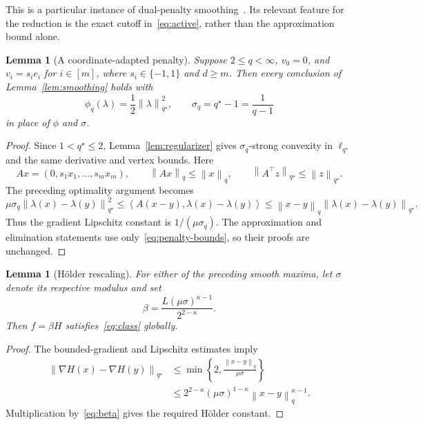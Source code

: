 \documentclass[11pt,a4paper]{article}
\newtheorem{lemma}[theorem]{Lemma}
\theoremstyle{definition}
\theoremstyle{remark}
\newcommand{\norm}[1]{\left\lVert #1\right\rVert}
\newcommand{\ip}[2]{\left\langle #1,#2\right\rangle}
\begin{document}
This is a particular instance of dual-penalty smoothing~\cite{Nes05}.
Its relevant feature for the reduction is the exact cutoff
in~\eqref{eq:active}, rather than the approximation bound alone.

\begin{lemma}[A coordinate-adapted penalty]\label{lem:coordinate-penalty}
Suppose $2\le q<\infty$, $v_0=0$, and $v_i=s_i e_i$ for
$i\in[m]$, where $s_i\in\{-1,1\}$ and $d\ge m$.
Then every conclusion of Lemma~\ref{lem:smoothing} holds with
\begin{equation}\label{eq:qpenalty}
  \phi_q(\lambda)=\frac12\norm{\lambda}_{q^\star}^2,
  \qquad \sigma_q=q^\star-1=\frac1{q-1}
\end{equation}
in place of $\phi$ and $\sigma$.
\end{lemma}

\begin{proof}
Since $1<q^\star\le2$, Lemma~\ref{lem:regularizer} gives
$\sigma_q$-strong convexity in $\ell_{q^\star}$ and the same derivative and
vertex bounds. Here
\[
  Ax=(0,s_1x_1,\ldots,s_mx_m),\qquad
  \norm{Ax}_q\le\norm{x}_q,
  \qquad \norm{A^\top z}_{q^\star}\le\norm{z}_{q^\star}.
\]
The preceding optimality argument becomes
\[
 \mu\sigma_q\norm{\lambda(x)-\lambda(y)}_{q^\star}^2
 \le\ip{A(x-y)}{\lambda(x)-\lambda(y)}
 \le\norm{x-y}_q\norm{\lambda(x)-\lambda(y)}_{q^\star}.
\]
Thus the gradient Lipschitz constant is $1/(\mu\sigma_q)$. The approximation
and elimination statements use only~\eqref{eq:penalty-bounds}, so their
proofs are unchanged.
\end{proof}

\begin{lemma}[H\"older rescaling]\label{lem:holder}
For either of the preceding smooth maxima, let $\sigma$ denote its respective
modulus and set
\begin{equation}\label{eq:beta}
  \beta=\frac{L(\mu\sigma)^{\kappa-1}}{2^{2-\kappa}}.
\end{equation}
Then $f=\beta H$ satisfies~\eqref{eq:class} globally.
\end{lemma}

\begin{proof}
The bounded-gradient and Lipschitz estimates imply
\begin{align*}
 \norm{\nabla H(x)-\nabla H(y)}_{q^\star}
 &\le\min\left\{2,\frac{\norm{x-y}_q}{\mu\sigma}\right\}\\
 &\le2^{2-\kappa}(\mu\sigma)^{1-\kappa}
                  \norm{x-y}_q^{\kappa-1}.
\end{align*}
Multiplication by~\eqref{eq:beta} gives the required H\"older constant.
\end{proof}
\end{document}
